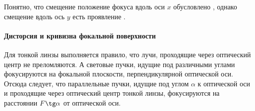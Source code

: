 Понятно, что смещение положение фокуса вдоль оси $x$ обусловлено , однако смещение вдоль ось $y$ есть проявление .

\paragraph{Дисторсия и кривизна фокальной поверхности}
Для тонкой линзы выполняется правило, что лучи, проходящие через оптический центр не преломляются. А световые пучки, идущие под различными углами фокусируются на фокальной плоскости, перпендикулярной оптической оси. Отсюда следует, что параллельные пучки, идущие под углом $\alpha$ к оптической оси и проходящие через оптический центр тонкой линзы, фокусируются на расстоянии $F \tg \alpha$ от оптической оси. 

